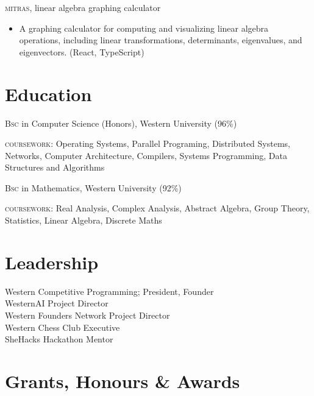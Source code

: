 \documentclass[11pt]{article} %
\begin{document}
\textsc{mitras}, linear algebra graphing calculator
\begin{itemize}
	\item A graphing calculator for computing and visualizing linear algebra operations, including linear transformations, determinants, eigenvalues, and eigenvectors. (React, TypeScript)
\end{itemize}


\section*{Education}

\textsc{Bsc} in Computer Science (Honors), Western University (96\%)
\smallskip

\textsc{coursework}: Operating Systems, Parallel Programing, Distributed Systems, Networks, Computer Architecture, Compilers, Systems Programming, Data Structures and Algorithms
\medskip

\textsc{Bsc} in Mathematics, Western University (92\%)
\smallskip

\textsc{coursework}: Real Analysis, Complex Analysis, Abstract Algebra, Group Theory, Statistics, Linear Algebra, Discrete Maths
\medskip


\section*{Leadership}
Western Competitive Programming; President, Founder\\
WesternAI Project Director\\
Western Founders Network Project Director\\
Western Chess Club Executive\\
SheHacks Hackathon Mentor\\


\section*{Grants, Honours \& Awards}
\end{document}
